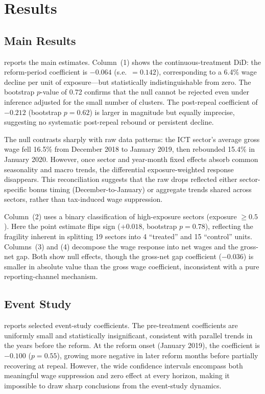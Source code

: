 \documentclass[12pt]{article}
\begin{document}
\section{Results}

\subsection{Main Results}



 reports the main estimates. Column~(1) shows the continuous-treatment DiD: the reform-period coefficient is $-0.064$ (s.e.~$= 0.142$), corresponding to a 6.4\% wage decline per unit of exposure---but statistically indistinguishable from zero. The bootstrap $p$-value of 0.72 confirms that the null cannot be rejected even under inference adjusted for the small number of clusters. The post-repeal coefficient of $-0.212$ (bootstrap $p = 0.62$) is larger in magnitude but equally imprecise, suggesting no systematic post-repeal rebound or persistent decline.

The null contrasts sharply with raw data patterns: the ICT sector's average gross wage fell 16.5\% from December 2018 to January 2019, then rebounded 15.4\% in January 2020. However, once sector and year-month fixed effects absorb common seasonality and macro trends, the differential exposure-weighted response disappears. This reconciliation suggests that the raw drops reflected either sector-specific bonus timing (December-to-January) or aggregate trends shared across sectors, rather than tax-induced wage suppression.

Column~(2) uses a binary classification of high-exposure sectors (exposure $\geq 0.5$). Here the point estimate flips sign ($+0.018$, bootstrap $p = 0.78$), reflecting the fragility inherent in splitting 19 sectors into 4 ``treated'' and 15 ``control'' units. Columns~(3) and (4) decompose the wage response into net wages and the gross-net gap. Both show null effects, though the gross-net gap coefficient ($-0.036$) is smaller in absolute value than the gross wage coefficient, inconsistent with a pure reporting-channel mechanism.

\subsection{Event Study}



 reports selected event-study coefficients. The pre-treatment coefficients are uniformly small and statistically insignificant, consistent with parallel trends in the years before the reform. At the reform onset (January 2019), the coefficient is $-0.100$ ($p = 0.55$), growing more negative in later reform months before partially recovering at repeal. However, the wide confidence intervals encompass both meaningful wage suppression and zero effect at every horizon, making it impossible to draw sharp conclusions from the event-study dynamics.
\end{document}
